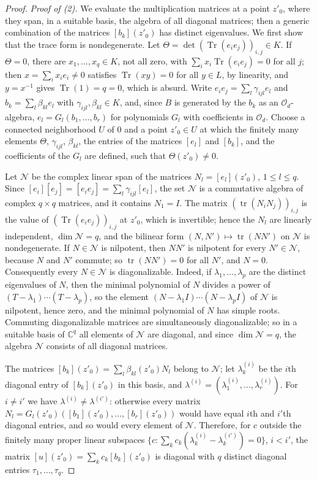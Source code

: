 \begin{proof}
\emph{Proof of {\upshape(2)}.} We evaluate the multiplication matrices at a point $z'_0$, where they span, in a suitable basis, the algebra of all diagonal matrices; then a generic combination of the matrices $[b_k](z'_0)$ has distinct eigenvalues. We first show that the trace form is nondegenerate. Let $\Theta=\det(\operatorname{Tr}(e_ie_j))_{i,j}\in K$. If $\Theta=0$, there are $x_1,\ldots,x_q\in K$, not all zero, with $\sum_ix_i\operatorname{Tr}(e_ie_j)=0$ for all $j$; then $x=\sum_ix_ie_i\neq0$ satisfies $\operatorname{Tr}(xy)=0$ for all $y\in L$, by linearity, and $y=x^{-1}$ gives $\operatorname{Tr}(1)=q=0$, which is absurd. Write $e_ie_j=\sum_l\gamma_{ijl}e_l$ and $b_k=\sum_l\beta_{kl}e_l$ with $\gamma_{ijl},\beta_{kl}\in K$, and, since $B$ is generated by the $b_k$ as an $\mathcal O_d$-algebra, $e_l=G_l(b_1,\ldots,b_r)$ for polynomials $G_l$ with coefficients in $\mathcal O_d$. Choose a connected neighborhood $U$ of $0$ and a point $z'_0\in U$ at which the finitely many elements $\Theta$, $\gamma_{ijl}$, $\beta_{kl}$, the entries of the matrices $[e_l]$ and $[b_k]$, and the coefficients of the $G_l$ are defined, such that $\Theta(z'_0)\neq0$.

Let $\mathcal N$ be the complex linear span of the matrices $N_l=[e_l](z'_0)$, $1\leq l\leq q$. Since $[e_i][e_j]=[e_ie_j]=\sum_l\gamma_{ijl}[e_l]$, the set $\mathcal N$ is a commutative algebra of complex $q\times q$ matrices, and it contains $N_1=I$. The matrix $(\operatorname{tr}(N_iN_j))_{i,j}$ is the value of $(\operatorname{Tr}(e_ie_j))_{i,j}$ at $z'_0$, which is invertible; hence the $N_l$ are linearly independent, $\dim\mathcal N=q$, and the bilinear form $(N,N')\mapsto\operatorname{tr}(NN')$ on $\mathcal N$ is nondegenerate. If $N\in\mathcal N$ is nilpotent, then $NN'$ is nilpotent for every $N'\in\mathcal N$, because $N$ and $N'$ commute; so $\operatorname{tr}(NN')=0$ for all $N'$, and $N=0$. Consequently every $N\in\mathcal N$ is diagonalizable. Indeed, if $\lambda_1,\ldots,\lambda_p$ are the distinct eigenvalues of $N$, then the minimal polynomial of $N$ divides a power of $(T-\lambda_1)\cdots(T-\lambda_p)$, so the element $(N-\lambda_1I)\cdots(N-\lambda_pI)$ of $\mathcal N$ is nilpotent, hence zero, and the minimal polynomial of $N$ has simple roots. Commuting diagonalizable matrices are simultaneously diagonalizable; so in a suitable basis of $\mathbb C^q$ all elements of $\mathcal N$ are diagonal, and since $\dim\mathcal N=q$, the algebra $\mathcal N$ consists of all diagonal matrices.

The matrices $[b_k](z'_0)=\sum_l\beta_{kl}(z'_0)N_l$ belong to $\mathcal N$; let $\lambda^{(i)}_k$ be the $i$th diagonal entry of $[b_k](z'_0)$ in this basis, and $\lambda^{(i)}=(\lambda^{(i)}_1,\ldots,\lambda^{(i)}_r)$. For $i\neq i'$ we have $\lambda^{(i)}\neq\lambda^{(i')}$: otherwise every matrix $N_l=G_l(z'_0)([b_1](z'_0),\ldots,[b_r](z'_0))$ would have equal $i$th and $i'$th diagonal entries, and so would every element of $\mathcal N$. Therefore, for $c$ outside the finitely many proper linear subspaces $\{c:\sum_kc_k(\lambda^{(i)}_k-\lambda^{(i')}_k)=0\}$, $i<i'$, the matrix $[u](z'_0)=\sum_kc_k[b_k](z'_0)$ is diagonal with $q$ distinct diagonal entries $\tau_1,\ldots,\tau_q$.


\end{proof}
